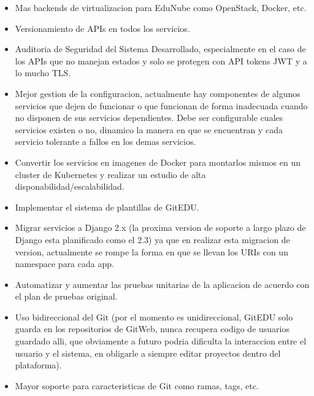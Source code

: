 \begin{itemize}
    \item Mas backends de virtualizacion para EduNube como OpenStack, Docker, etc.
    \item Versionamiento de APIs en todos los servicios.
    \item Auditoria de Seguridad del Sistema Desarrollado, especialmente en el caso de los APIs que no manejan estados y solo se protegen con API tokens JWT y a lo mucho TLS.
    \item Mejor gestion de la configuracion, actualmente hay componentes de algunos servicios que dejen de funcionar o que funcionan de forma inadecuada cuando no disponen de sus servicios dependientes. Debe ser configurable cuales servicios existen o no, dinamico la manera en que se encuentran y cada servicio tolerante a fallos en los demas servicios.
    \item Convertir los servicios en imagenes de Docker para montarlos mismos en un cluster de Kubernetes y realizar un estudio de alta disponabilidad/escalabilidad.
    \item Implementar el sistema de plantillas de GitEDU.
    \item Migrar servicios a Django 2.x (la proxima version de soporte a largo plazo de Django esta planificado como el 2.3) ya que en realizar esta migracion de version, actualmente se rompe la forma en que se llevan los URIs con un namespace para cada app.
    \item Automatizar y aumentar las pruebas unitarias de la aplicacion de acuerdo con el plan de pruebas original.
    \item Uso bidireccional del Git (por el momento es unidireccional, GitEDU solo guarda en los repositorios de GitWeb, nunca recupera codigo de usuarios guardado alli, que obviamente a futuro podria dificulta la interaccion entre el usuario y el sistema, en obligarle a siempre editar proyectos dentro del plataforma).
    \item Mayor soporte para caracteristicas de Git como ramas, tags, etc.
\end{itemize}
